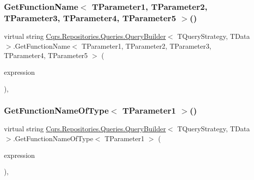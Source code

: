 \subsubsection{\texorpdfstring{Get\+Function\+Name$<$ T\+Parameter1, T\+Parameter2, T\+Parameter3, T\+Parameter4, T\+Parameter5 $>$()}{GetFunctionName< TParameter1, TParameter2, TParameter3, TParameter4, TParameter5 >()}}
{\footnotesize\ttfamily virtual string \hyperlink{classCqrs_1_1Repositories_1_1Queries_1_1QueryBuilder}{Cqrs.\+Repositories.\+Queries.\+Query\+Builder}$<$ T\+Query\+Strategy, T\+Data $>$.Get\+Function\+Name$<$ T\+Parameter1, T\+Parameter2, T\+Parameter3, T\+Parameter4, T\+Parameter5 $>$ (\begin{DoxyParamCaption}\item[{Func$<$ T\+Parameter1, T\+Parameter2, T\+Parameter3, T\+Parameter4, T\+Parameter5, T\+Query\+Strategy $>$}]{expression }\end{DoxyParamCaption})\hspace{0.3cm}{\ttfamily [protected]}, {\ttfamily [virtual]}}

\mbox{\label{classCqrs_1_1Repositories_1_1Queries_1_1QueryBuilder_a09b5db1f6e86d02c04f132080e88aa38}} 
\subsubsection{\texorpdfstring{Get\+Function\+Name\+Of\+Type$<$ T\+Parameter1 $>$()}{GetFunctionNameOfType< TParameter1 >()}}
{\footnotesize\ttfamily virtual string \hyperlink{classCqrs_1_1Repositories_1_1Queries_1_1QueryBuilder}{Cqrs.\+Repositories.\+Queries.\+Query\+Builder}$<$ T\+Query\+Strategy, T\+Data $>$.Get\+Function\+Name\+Of\+Type$<$ T\+Parameter1 $>$ (\begin{DoxyParamCaption}\item[{Func$<$ T\+Parameter1, \hyperlink{interfaceCqrs_1_1Repositories_1_1Queries_1_1IQueryPredicate}{I\+Query\+Predicate} $>$}]{expression }\end{DoxyParamCaption})\hspace{0.3cm}{\ttfamily [protected]}, {\ttfamily [virtual]}}

